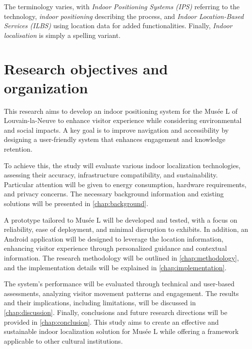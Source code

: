 The terminology varies, with \textit{Indoor Positioning Systems (IPS)}  referring to the technology, \textit{indoor positioning} describing the process, and \textit{Indoor Location-Based Services (ILBS)}  using location data for added functionalities. Finally, \textit{Indoor localisation} is simply a spelling variant. 

\section{Research objectives and organization}



This research aims to develop an indoor positioning system for the Musée L of Louvain-la-Neuve to enhance visitor experience while considering environmental and social impacts. A key goal is to improve navigation and accessibility by designing a user-friendly system that enhances engagement and knowledge retention.  

To achieve this, the study will evaluate various indoor localization technologies, assessing their accuracy, infrastructure compatibility, and sustainability. Particular attention will be given to energy consumption, hardware requirements, and privacy concerns. The necessary background information and existing solutions will be presented in \autoref{chap:background}.

A prototype tailored to Musée L will be developed and tested, with a focus on reliability, ease of deployment, and minimal disruption to exhibits. In addition, an Android application will be designed to leverage the location information, enhancing visitor experience through personalized guidance and contextual information. The research methodology will be outlined in \autoref{chap:methodology}, and the implementation details will be explained in \autoref{chap:implementation}.   

The system’s performance will be evaluated through technical and user-based assessments, analyzing visitor movement patterns and engagement. The results and their implications, including limitations, will be discussed in \autoref{chap:discussion}. Finally, conclusions and future research directions will be provided in \autoref{chap:conclusion}. This study aims to create an effective and sustainable indoor localization solution for Musée L while offering a framework applicable to other cultural institutions. 